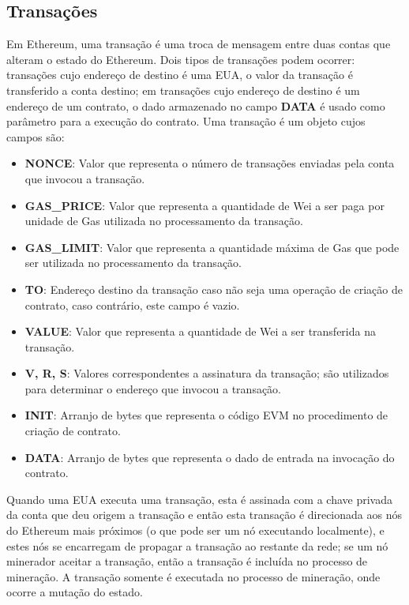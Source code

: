 \documentclass[tcc,capa]{texufpel}
\begin{document}
    
	\subsection{Transações}\label{ssc:transacoes}
	
	Em Ethereum, uma transação é uma troca de mensagem entre duas contas que alteram o estado do Ethereum. Dois tipos de transações podem ocorrer: transações cujo endereço de destino é uma EUA, o valor da transação é transferido a conta destino; em transações cujo endereço de destino é um endereço de um contrato, o dado armazenado no campo \textbf{DATA} é usado como parâmetro para a execução do contrato. Uma transação é um objeto cujos campos são:
	
	\begin{itemize}
	    \item \textbf{NONCE}: Valor que representa o número de transações enviadas pela conta que invocou a transação.
	    \item \textbf{GAS\_PRICE}: Valor que representa a quantidade de Wei a ser paga por unidade de Gas utilizada no processamento da transação.
	    \item \textbf{GAS\_LIMIT}: Valor que representa a quantidade máxima de Gas que pode ser utilizada no processamento da transação.
	    \item \textbf{TO}: Endereço destino da transação caso não seja uma operação de criação de contrato, caso contrário, este campo é vazio.
	    \item \textbf{VALUE}: Valor que representa a quantidade de Wei a ser transferida na transação.
	    \item \textbf{V, R, S}: Valores correspondentes a assinatura da transação; são utilizados para determinar o endereço que invocou a transação.
	    \item \textbf{INIT}: Arranjo de bytes que representa o código EVM no procedimento de criação de contrato.
	    \item \textbf{DATA}: Arranjo de bytes que representa o dado de entrada na invocação do contrato.
	\end{itemize}
	
	Quando uma EUA executa uma transação, esta é assinada com a chave privada da conta que deu origem a transação e então esta transação é direcionada aos nós do Ethereum mais próximos (o que pode ser um nó executando localmente), e estes nós se encarregam de propagar a transação ao restante da rede; se um nó minerador aceitar a transação, então a transação é incluída no processo de mineração. A transação somente é executada no processo de mineração, onde ocorre a mutação do estado.
	
\end{document}
